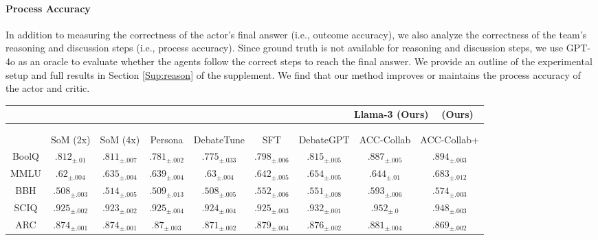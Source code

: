 \paragraph{Process Accuracy} In addition to measuring the correctness of the actor's final answer (i.e., outcome accuracy), we also analyze the correctness of the team's reasoning and discussion steps (i.e., process accuracy). Since ground truth is not available for reasoning and discussion steps, we use GPT-4o as an oracle to evaluate whether the agents follow the correct steps to reach the final answer. We provide an outline of the experimental setup and full results in Section \ref{Sup:reason} of the supplement. We find that our method improves or maintains the process accuracy of the actor and critic.


\begin{table}[tbh]
    \centering
\begin{adjustbox}{max width=1.0\textwidth}
    \begin{tabular}{c|c|c|c|c|c|c||c|c}
\multicolumn{9}{r}{\textbf{Llama-3} \qquad\qquad\qquad\qquad\qquad\qquad  (Ours)      \quad\qquad~   (Ours)\qquad~}\\
\hline\vspace{2pt}\\
\multicolumn{9}{c}{}\vspace{-20pt}\\

& SoM (2x) & SoM (4x) & Persona & DebateTune & SFT & DebateGPT & \cellcolor{green!20} ACC-Collab & \cellcolor{green!20} ACC-Collab+\\
BoolQ & $.812_{\pm.01}$ & $.811_{\pm.007}$ & $.781_{\pm.002}$ & $.775_{\pm.033}$ & $.798_{\pm.006}$ & $.815_{\pm.005}$ & $.887_{\pm.005}$ & $\mathbf{.894}_{\pm.003}$\\ 
MMLU & $.62_{\pm.004}$ & $.635_{\pm.004}$ & $.639_{\pm.004}$ & $.63_{\pm.004}$ & $.642_{\pm.005}$ & $.654_{\pm.005}$ & $.644_{\pm.01}$ & $\mathbf{.683}_{\pm.012}$\\ 
BBH & $.508_{\pm.003}$ & $.514_{\pm.005}$ & $.509_{\pm.013}$ & $.508_{\pm.005}$ & $.552_{\pm.006}$ & $.551_{\pm.008}$ & $\mathbf{.593}_{\pm.006}$ & $.574_{\pm.003}$\\ 
SCIQ & $.925_{\pm.002}$ & $.923_{\pm.002}$ & $.925_{\pm.004}$ & $.924_{\pm.004}$ & $.925_{\pm.003}$ & $.932_{\pm.001}$ & $\mathbf{.952}_{\pm.0}$ & $.948_{\pm.003}$\\ 
ARC & $.874_{\pm.001}$ & $.874_{\pm.001}$ & $.87_{\pm.003}$ & $.871_{\pm.002}$ & $.879_{\pm.004}$ & $.876_{\pm.002}$ & $\mathbf{.881}_{\pm.004}$ & $.869_{\pm.002}$\\ 



\end{tabular}
\end{adjustbox}
\end{table}
